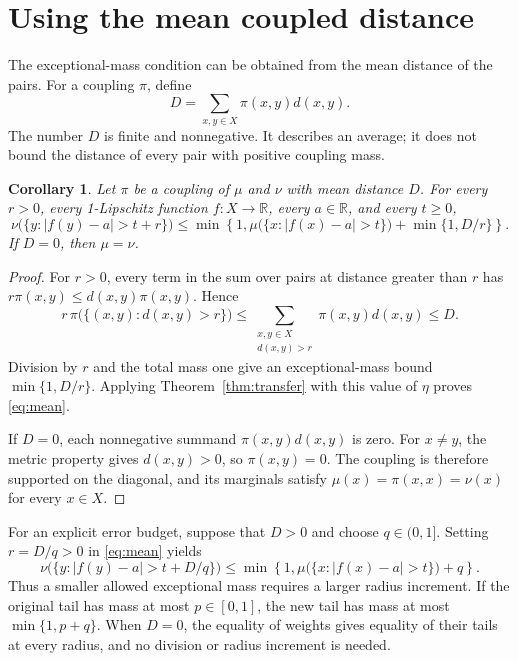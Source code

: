 \documentclass[a4paper,11pt]{article}
\newtheorem{corollary}[theorem]{Corollary}
\begin{document}
\section{Using the mean coupled distance}

The exceptional-mass condition can be obtained from the mean distance of
the pairs. For a coupling $\pi$, define
\[
 D=\sum_{x,y\in X}\pi(x,y)d(x,y).
\]
The number $D$ is finite and nonnegative. It describes an average; it
does not bound the distance of every pair with positive coupling mass.

\begin{corollary}\label{cor:mean}
Let $\pi$ be a coupling of $\mu$ and $\nu$ with mean distance $D$.
For every $r>0$, every 1-Lipschitz function $f:X\to\mathbb R$, every
$a\in\mathbb R$, and every $t\ge0$,
\begin{equation}\label{eq:mean}
 \nu\bigl(\{y:|f(y)-a|>t+r\}\bigr)
 \le
 \min\left\{1,
 \mu\bigl(\{x:|f(x)-a|>t\}\bigr)
 +\min\{1,D/r\}\right\}.
\end{equation}
If $D=0$, then $\mu=\nu$.
\end{corollary}

\begin{proof}
For $r>0$, every term in the sum over pairs at distance greater than $r$
has $r\pi(x,y)\le d(x,y)\pi(x,y)$. Hence
\[
 r\,\pi\bigl(\{(x,y):d(x,y)>r\}\bigr)
 \le \sum_{\substack{x,y\in X\\d(x,y)>r}}\pi(x,y)d(x,y)
 \le D.
\]
Division by $r$ and the total mass one give an exceptional-mass bound
$\min\{1,D/r\}$. Applying Theorem~\ref{thm:transfer} with this value of
$\eta$ proves \eqref{eq:mean}.

If $D=0$, each nonnegative summand $\pi(x,y)d(x,y)$ is zero.
For $x\ne y$, the metric property gives $d(x,y)>0$, so $\pi(x,y)=0$.
The coupling is therefore supported on the diagonal, and its marginals
satisfy $\mu(x)=\pi(x,x)=\nu(x)$ for every $x\in X$.
\end{proof}

For an explicit error budget, suppose that $D>0$ and choose
$q\in(0,1]$. Setting $r=D/q>0$ in \eqref{eq:mean} yields
\begin{equation}\label{eq:budget}
 \nu\bigl(\{y:|f(y)-a|>t+D/q\}\bigr)
 \le \min\left\{1,
 \mu\bigl(\{x:|f(x)-a|>t\}\bigr)+q\right\}.
\end{equation}
Thus a smaller allowed exceptional mass requires a larger radius
increment. If the original tail has mass at most $p\in[0,1]$, the new
tail has mass at most $\min\{1,p+q\}$. When $D=0$, the equality of
weights gives equality of their tails at every radius, and no division
or radius increment is needed.
\end{document}
